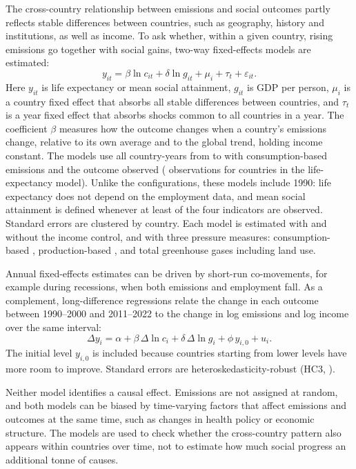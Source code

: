 The cross-country relationship between emissions and social outcomes partly reflects stable differences between countries, such as geography, history and institutions, as well as income. To ask whether, within a given country, rising emissions go together with social gains, two-way fixed-effects models are estimated:
\begin{equation}\label{eq:fe}
y_{it} = \beta \ln c_{it} + \delta \ln g_{it} + \mu_i + \tau_t + \varepsilon_{it}.
\end{equation}
Here $y_{it}$ is life expectancy or mean social attainment, $g_{it}$ is GDP per person, $\mu_i$ is a country fixed effect that absorbs all stable differences between countries, and $\tau_t$ is a year fixed effect that absorbs shocks common to all countries in a year. The coefficient $\beta$ measures how the outcome changes when a country's emissions change, relative to its own average and to the global trend, holding income constant. The models use all country-years from \nFirstYear{} to \nLastYear{} with consumption-based emissions and the outcome observed (\nFeN{} observations for \nFeCountries{} countries in the life-expectancy model). Unlike the configurations, these models include 1990: life expectancy does not depend on the employment data, and mean social attainment is defined whenever at least \nMinSocial{} of the four indicators are observed. Standard errors are clustered by country. Each model is estimated with and without the income control, and with three pressure measures: consumption-based \COtwo, production-based \COtwo, and total greenhouse gases including land use.

Annual fixed-effects estimates can be driven by short-run co-movements, for example during recessions, when both emissions and employment fall. As a complement, long-difference regressions relate the change in each outcome between 1990--2000 and 2011--2022 to the change in log emissions and log income over the same interval:
\begin{equation}\label{eq:ld}
\Delta y_i = \alpha + \beta\, \Delta \ln c_i + \delta\, \Delta \ln g_i + \phi\, y_{i,0} + u_i.
\end{equation}
The initial level $y_{i,0}$ is included because countries starting from lower levels have more room to improve. Standard errors are heteroskedasticity-robust (HC3, \citealp{mackinnon1985}).

Neither model identifies a causal effect. Emissions are not assigned at random, and both models can be biased by time-varying factors that affect emissions and outcomes at the same time, such as changes in health policy or economic structure. The models are used to check whether the cross-country pattern also appears within countries over time, not to estimate how much social progress an additional tonne of \COtwo{} causes.

